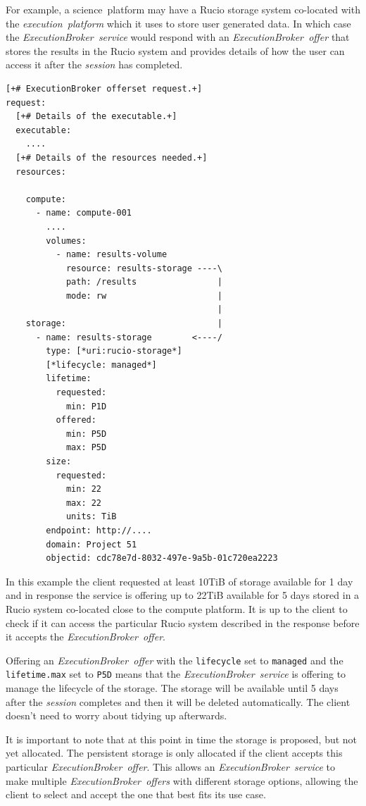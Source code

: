 \documentclass[11pt,a4paper]{ivoa}
\newcommand{\execbrokerservice}[1] {\textit{ExecutionBroker~service#1}}
\newcommand{\execoffer}[1] {\textit{ExecutionBroker~offer#1}}
\newcommand{\execplatform} {\textit{execution~platform}}
\newcommand{\workerjob}[1] {\textit{session#1}}
\newcommand{\rucio} {Rucio}
\newcommand{\codeword}[1] {\texttt{#1}}
\newcommand{\scienceplatform}[1] {science~platform#1}
\begin{document}
For example, a \scienceplatform{} may have a \rucio{} storage system co-located
with the \execplatform{} which it uses to store user generated data.
In which case the \execbrokerservice{} would respond with an \execoffer{} that
stores the results in the \rucio{} system and provides details of how the user
can access it after the \workerjob{} has completed.

\begin{lstlisting}[]
[+# ExecutionBroker offerset request.+]
request:
  [+# Details of the executable.+]
  executable:
    ....
  [+# Details of the resources needed.+]
  resources:

    compute:
      - name: compute-001
        ....
        volumes:
          - name: results-volume
            resource: results-storage ----\
            path: /results                |
            mode: rw                      |
                                          |
    storage:                              |
      - name: results-storage        <----/
        type: [*uri:rucio-storage*]
        [*lifecycle: managed*]
        lifetime:
          requested:
            min: P1D
          offered:
            min: P5D
            max: P5D
        size:
          requested:
            min: 22
            max: 22
            units: TiB
        endpoint: http://....
        domain: Project 51
        objectid: cdc78e7d-8032-497e-9a5b-01c720ea2223
\end{lstlisting}


In this example the client requested at least 10TiB of storage available for 1 day
and in response the service is offering up to 22TiB available for 5 days stored in a
\rucio{} system co-located close to the compute platform.
It is up to the client to check if it can access the particular \rucio{} system
described in the response before it accepts the \execoffer{}.

Offering an \execoffer{} with the \codeword{lifecycle} set to \codeword{managed} and the
\codeword{lifetime.max} set to \codeword{P5D}
means that the \execbrokerservice{} is offering to manage the lifecycle of the storage.
The storage will be available until 5 days after the \workerjob{} completes and then it
will be deleted automatically.
The client doesn't need to worry about tidying up afterwards.

It is important to note that at this point in time the storage is proposed, but not yet allocated.
The persistent storage is only allocated if the client accepts this particular \execoffer{}.
This allows an \execbrokerservice{} to make multiple \execoffer{s} with different storage options,
allowing the client to select and accept the one that best fits its use case.
\end{document}
